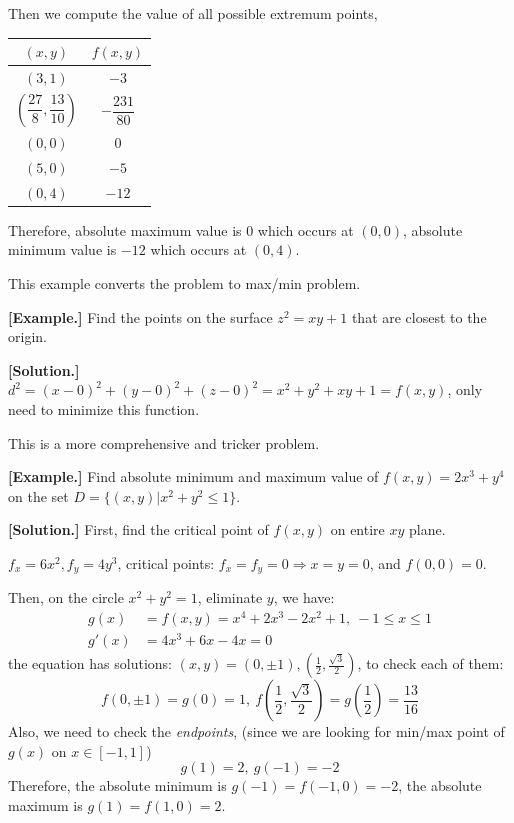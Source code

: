 \documentclass[11pt, a4paper]{MATH2023}
\newcommand{\eg}{\textbf{[Example.] }}
\newcommand{\sol}{\textbf{[Solution.] }}
\begin{document}
\begin{spacing}{1.3}
    Then we compute the value of all possible extremum points,
    \begin{center}
        \begin{tabular}{c|c}\hline\hline
            $(x,y)$ & $f(x,y)$ \\\hline\hline
            $(3,1)$ & $-3$\\\hline
            $\left(\dfrac{27}{8}, \dfrac{13}{10}\right)$ & $-\dfrac{231}{80}$\\\hline
            $(0,0)$ & 0 \\\hline
            $(5,0)$ & $-5$ \\\hline
            $(0,4)$ & $-12$ \\\hline
        \end{tabular}
    \end{center}

    Therefore, absolute maximum value is 0 which occurs at $(0,0)$,
    absolute minimum value is $-12$ which occurs at $(0,4)$. 


    \vspace{0.2in}
    {\blue This example converts the problem to max/min problem.}

    \eg Find the points on the surface $z^2=xy+1$ that are closest to the origin.

    \sol $d^2=(x-0)^2+(y-0)^2+(z-0)^2=x^2+y^2+xy+1=f(x,y)$, only need to minimize this function.


    \newpage
    {\blue This is a more comprehensive and tricker problem.}

    \eg Find absolute minimum and maximum value of $f(x,y)=2x^3+y^4$ on the set 
    $D=\{(x,y)|x^2+y^2\le 1\}$.

    \sol First, find the critical point of $f(x,y)$ on entire $xy$ plane.

    $f_x=6x^2, f_y=4y^3$, critical points: $f_x=f_y=0\Rightarrow x=y=0$, and $f(0,0)=0$.

    Then, on the circle $x^2+y^2=1$, eliminate $y$, we have:
    \begin{align*}
        g(x) &= f(x,y)=x^4+2x^3-2x^2+1,\ -1\le x\le 1\\
        g'(x) &= 4x^3+6x-4x=0
    \end{align*}
    the equation has solutions: $(x,y)=(0, \pm 1), \left(\frac{1}{2}, \frac{\sqrt{3}}{2}\right)$,
    to check each of them:
    $$f(0, \pm 1)=g(0)=1,\ f\left(\frac{1}{2}, \frac{\sqrt{3}}{2}\right)=g\left(\frac{1}{2}\right)=\frac{13}{16}$$
    Also, we need to check the {\it endpoints}, (since we are looking for min/max point of $g(x)$ on $x\in [-1,1]$)
    $$g(1)=2,\ g(-1)=-2$$
    Therefore, the absolute minimum is $g(-1)=f(-1,0)=-2$, the absolute maximum is $g(1)=f(1,0)=2$.


\end{spacing}
\end{document}
